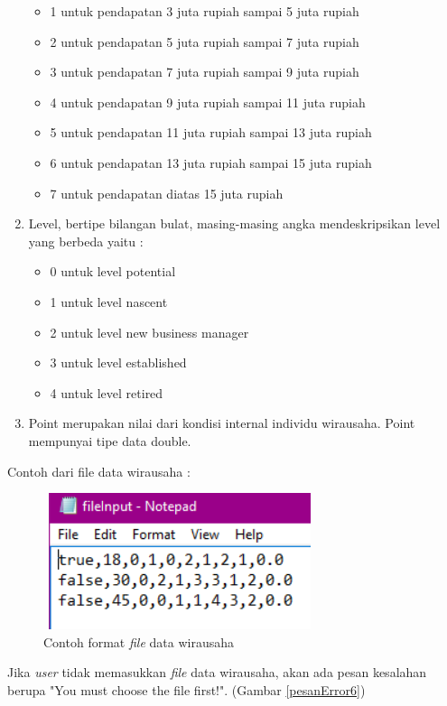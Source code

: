 \begin{enumerate}
\begin{itemize}
			\item 1 untuk pendapatan 3 juta rupiah sampai 5 juta rupiah
			\item 2 untuk pendapatan 5 juta rupiah sampai 7 juta rupiah
			\item 3 untuk pendapatan 7 juta rupiah sampai 9 juta rupiah
			\item 4 untuk pendapatan 9 juta rupiah sampai 11 juta rupiah
			\item 5 untuk pendapatan 11 juta rupiah sampai 13 juta rupiah
			\item 6 untuk pendapatan 13 juta rupiah sampai 15 juta rupiah
			\item 7 untuk pendapatan diatas 15 juta rupiah
			\end{itemize}
		\item Level, bertipe bilangan bulat, masing-masing angka mendeskripsikan level yang berbeda yaitu :
			\begin{itemize}
			\item 0 untuk level potential
			\item 1 untuk level nascent
			\item 2 untuk level new business manager
			\item 3 untuk level established 
			\item 4 untuk level retired
			\end{itemize}
		\item Point merupakan nilai dari kondisi internal individu wirausaha. Point mempunyai tipe data double.
\end{enumerate}

Contoh dari file data wirausaha :

	\begin{figure} [H]
	\centering  
	\includegraphics[width=8cm, height=4cm]{formatFile} 
		\caption[Contoh format \textit{file} data wirausaha]{Contoh format \textit{file} data wirausaha}
	\label{formatFile} 
\end{figure}

Jika \textit{user} tidak memasukkan \textit{file} data wirausaha, akan ada pesan kesalahan berupa "You must choose the file first!". (Gambar \ref{pesanError6})

